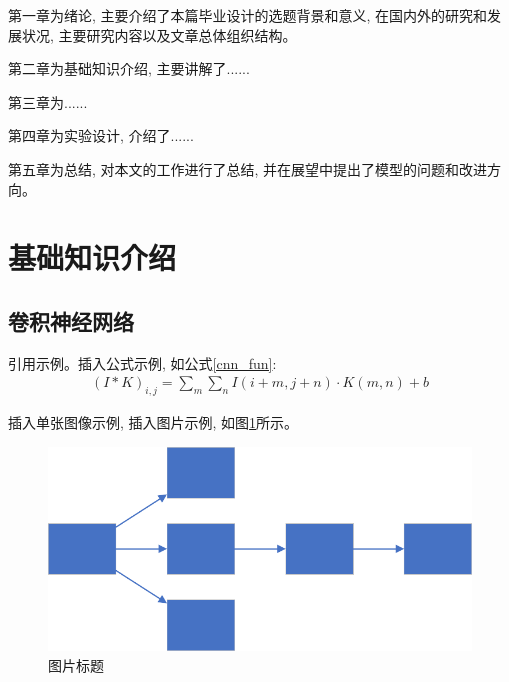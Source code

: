\documentclass[UTF8, twoside]{ctexart}
\begin{document}
第一章为绪论, 主要介绍了本篇毕业设计的选题背景和意义, 在国内外的研究和发展状况, 主要研究内容以及文章总体组织结构。

第二章为基础知识介绍, 主要讲解了......

第三章为......

第四章为实验设计, 介绍了......

第五章为总结, 对本文的工作进行了总结, 并在展望中提出了模型的问题和改进方向。

\vspace*{3pt}
\cleardoublepage
\section{基础知识介绍}
\subsection{卷积神经网络}
引用示例\cite{lenet1998,alexnet}。插入公式示例, 如公式\eqref{cnn_fun}:
\begin{align}
    (I * K)_{i, j}=\sum_m \sum_n I(i + m, j + n) \cdot K(m, n) + b
    \label{cnn_fun}
\end{align}

插入单张图像示例, 插入图片示例, 如图\ref{cnn_fig}所示。
\begin{figure}[tbhp]
    \centering
    \includegraphics[scale=0.5]{figures/1.pdf}
    \caption{图片标题}
    \label{cnn_fig}
\end{figure}
\end{document}
